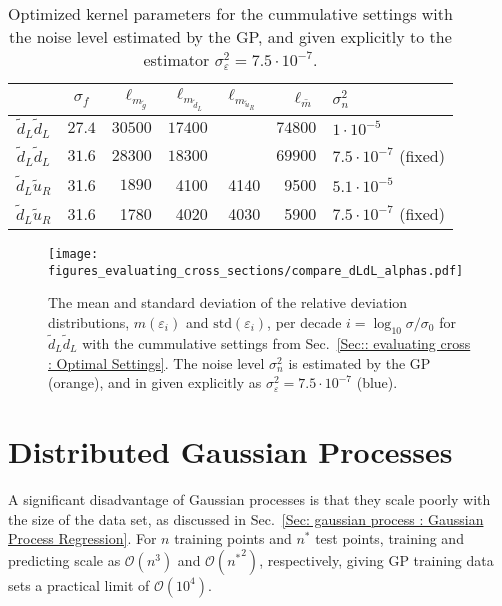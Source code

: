 \documentclass[twoside,english]{uiofysmaster}
\begin{document}
{\begin{table}
\centering
\begin{tabular}{@{}ccrrrrl@{}} \toprule
& $\sigma_f$ & $\ell_{m_{\widetilde{g}}}$ & $\ell_{m_{\widetilde{d}_L}}$ &$\ell_{m_{\widetilde{u}_R}}$ & $\ell_{\bar{m}}$ & $\sigma_n^2$\\
\midrule
$\widetilde{d}_L \widetilde{d}_L$ & $27.4$ & $30500$ & $17400$ && $74800$ & $1 \cdot 10^{-5}$\\
$\widetilde{d}_L \widetilde{d}_L$ & $31.6$ &  $28300$ & $18300$ && $69900$ & $7.5 \cdot 10^{-7}$ (fixed)\\
$\widetilde{d}_L \widetilde{u}_R$ & 31.6 & $1890$  & 4100 & 4140 & 9500 & $5.1 \cdot 10^{-5}$\\
$\widetilde{d}_L \widetilde{u}_R$ & 31.6& 1780&4020 &4030&5900 & $7.5 \cdot 10^{-7}$ (fixed)\\ \bottomrule
\end{tabular}
\caption{Optimized kernel parameters for the cummulative settings with the noise level estimated by the GP, and given explicitly to the estimator $\sigma_{\varepsilon}^2=7.5 \cdot 10^{-7}$.}
\label{Tab:: evaluating cross : optimal kernel parameters alpha}
\end{table}

\begin{figure}
\centering
\texttt{[image: figures\_evaluating\_cross\_sections/compare\_dLdL\_alphas.pdf]}
\caption{The mean and standard deviation of the relative deviation distributions, $m(\varepsilon_i)$ and $\mathrm{std}(\varepsilon_i)$, per decade $i = \log_{10} \sigma /\sigma_0$ for $\widetilde{d}_L \widetilde{d}_L$ with the cummulative settings from Sec.~\ref{Sec:: evaluating cross : Optimal Settings}. The noise level $\sigma_n^2$ is estimated by the GP (orange), and in given explicitly as $\sigma_{\varepsilon}^2=7.5 \cdot 10^{-7}$ (blue).}
\label{Fig:: evaluating cross : errors distribution alpha vs no alpha optimal}
\end{figure}




\section{Distributed Gaussian Processes}\label{Sec:: gaussian process : Distributed Gaussian Processes}



A significant disadvantage of Gaussian processes is that they scale poorly with the size of the data set, as discussed in Sec.~\ref{Sec: gaussian process : Gaussian Process Regression}. For $n$ training points and $n^*$ test points, training and predicting scale as $\mathcal{O}(n^3)$ and $\mathcal{O}({n^*}^2)$, respectively, giving GP training data sets a practical limit of $\mathcal{O}(10^4)$.

}
\end{document}
